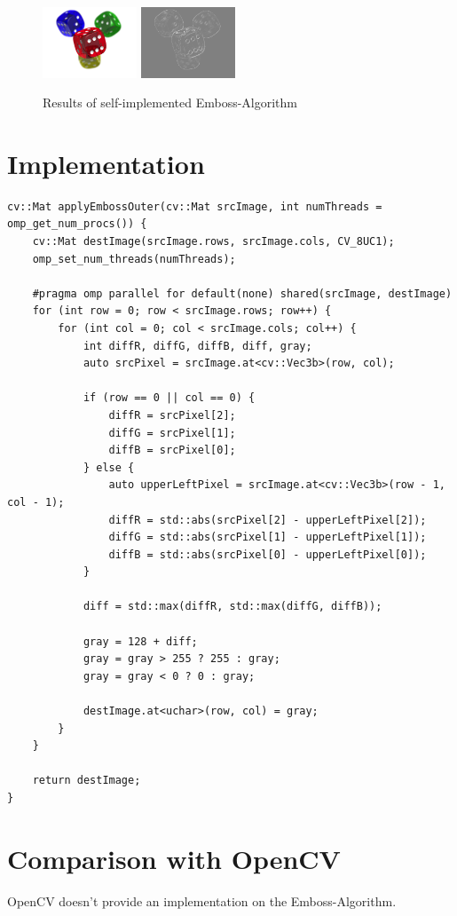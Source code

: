 \begin{figure}[H]
    \centering

    \includegraphics[width=0.25\textwidth]{images/dice.png}
    \includegraphics[width=0.25\textwidth]{images/own-emboss.png}
    
    \caption{Results of self-implemented Emboss-Algorithm}
    \label{fig:emboss}
\end{figure}

\section{Implementation}

\begin{listing}[H]
    \begin{verbatim}
cv::Mat applyEmbossOuter(cv::Mat srcImage, int numThreads = omp_get_num_procs()) {
    cv::Mat destImage(srcImage.rows, srcImage.cols, CV_8UC1);
    omp_set_num_threads(numThreads);

    #pragma omp parallel for default(none) shared(srcImage, destImage)
    for (int row = 0; row < srcImage.rows; row++) {
        for (int col = 0; col < srcImage.cols; col++) {
            int diffR, diffG, diffB, diff, gray;
            auto srcPixel = srcImage.at<cv::Vec3b>(row, col);

            if (row == 0 || col == 0) {
                diffR = srcPixel[2];
                diffG = srcPixel[1];
                diffB = srcPixel[0];
            } else {
                auto upperLeftPixel = srcImage.at<cv::Vec3b>(row - 1, col - 1);
                diffR = std::abs(srcPixel[2] - upperLeftPixel[2]);
                diffG = std::abs(srcPixel[1] - upperLeftPixel[1]);
                diffB = std::abs(srcPixel[0] - upperLeftPixel[0]);
            }

            diff = std::max(diffR, std::max(diffG, diffB));

            gray = 128 + diff;
            gray = gray > 255 ? 255 : gray;
            gray = gray < 0 ? 0 : gray;

            destImage.at<uchar>(row, col) = gray;
        }
    }

    return destImage;
}
    \end{verbatim}
    \label{listing:emboss}
\end{listing}

\section{Comparison with OpenCV}

OpenCV doesn't provide an implementation on the Emboss-Algorithm.